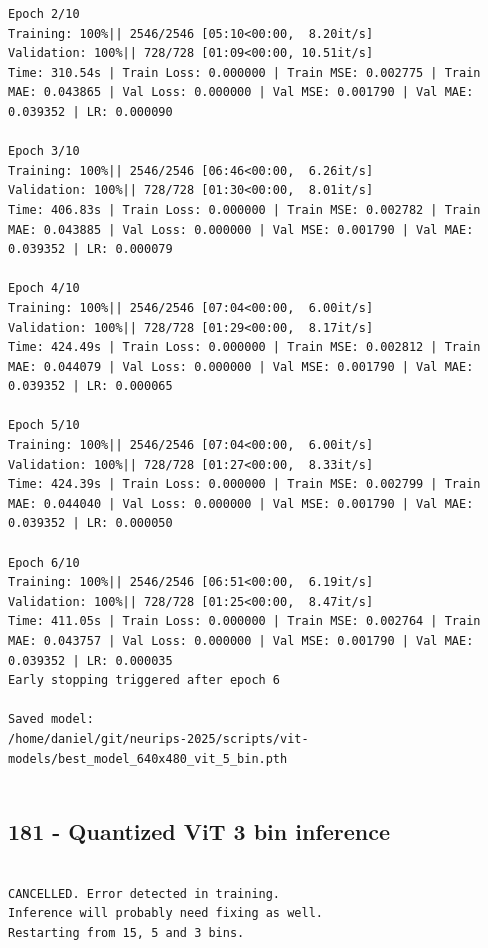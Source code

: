 \begin{verbatim}
Epoch 2/10
Training: 100%|| 2546/2546 [05:10<00:00,  8.20it/s]
Validation: 100%|| 728/728 [01:09<00:00, 10.51it/s]
Time: 310.54s | Train Loss: 0.000000 | Train MSE: 0.002775 | Train MAE: 0.043865 | Val Loss: 0.000000 | Val MSE: 0.001790 | Val MAE: 0.039352 | LR: 0.000090

Epoch 3/10
Training: 100%|| 2546/2546 [06:46<00:00,  6.26it/s]
Validation: 100%|| 728/728 [01:30<00:00,  8.01it/s]
Time: 406.83s | Train Loss: 0.000000 | Train MSE: 0.002782 | Train MAE: 0.043885 | Val Loss: 0.000000 | Val MSE: 0.001790 | Val MAE: 0.039352 | LR: 0.000079

Epoch 4/10
Training: 100%|| 2546/2546 [07:04<00:00,  6.00it/s]
Validation: 100%|| 728/728 [01:29<00:00,  8.17it/s]
Time: 424.49s | Train Loss: 0.000000 | Train MSE: 0.002812 | Train MAE: 0.044079 | Val Loss: 0.000000 | Val MSE: 0.001790 | Val MAE: 0.039352 | LR: 0.000065

Epoch 5/10
Training: 100%|| 2546/2546 [07:04<00:00,  6.00it/s]
Validation: 100%|| 728/728 [01:27<00:00,  8.33it/s]
Time: 424.39s | Train Loss: 0.000000 | Train MSE: 0.002799 | Train MAE: 0.044040 | Val Loss: 0.000000 | Val MSE: 0.001790 | Val MAE: 0.039352 | LR: 0.000050

Epoch 6/10
Training: 100%|| 2546/2546 [06:51<00:00,  6.19it/s]
Validation: 100%|| 728/728 [01:25<00:00,  8.47it/s]
Time: 411.05s | Train Loss: 0.000000 | Train MSE: 0.002764 | Train MAE: 0.043757 | Val Loss: 0.000000 | Val MSE: 0.001790 | Val MAE: 0.039352 | LR: 0.000035
Early stopping triggered after epoch 6

Saved model:
/home/daniel/git/neurips-2025/scripts/vit-models/best_model_640x480_vit_5_bin.pth


\end{verbatim}

\subsection{181 - Quantized ViT 3 bin inference}
\label{app_res:181}

\begin{verbatim}

CANCELLED. Error detected in training.
Inference will probably need fixing as well.
Restarting from 15, 5 and 3 bins.

\end{verbatim}

